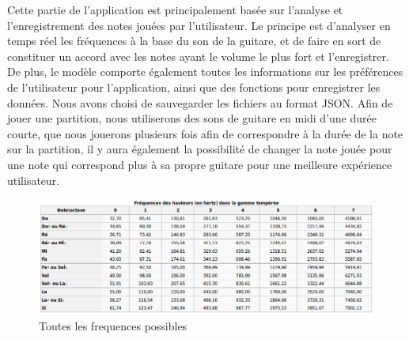 Cette partie de l'application est principalement basée sur l'analyse et l'enregistrement des notes jouées par 
l'utilisateur. Le principe est d'analyser en temps réel les fréquences à la base du son de la guitare, et de faire en sort de constituer un accord
avec les notes ayant le volume le plus fort et l'enregistrer. De plus, le modèle comporte également toutes les informations sur les préférences
de l'utilisateur pour l'application,   ainsi que des fonctions pour enregistrer les données. Nous avons choisi de sauvegarder les fichiers au format JSON. \newline
Afin de jouer une partition, nous utiliserons des sons de guitare en midi d'une durée courte, que nous jouerons plusieurs fois afin de correspondre à la durée de la note sur la partition, il y aura également la possibilité de changer la note jouée pour une note qui correspond plus à sa propre guitare pour une meilleure expérience utilisateur.

\begin{figure}[H]
\centering
\includegraphics[scale=0.5]{Frequences}
\caption{Toutes les frequences possibles}
\end{figure}